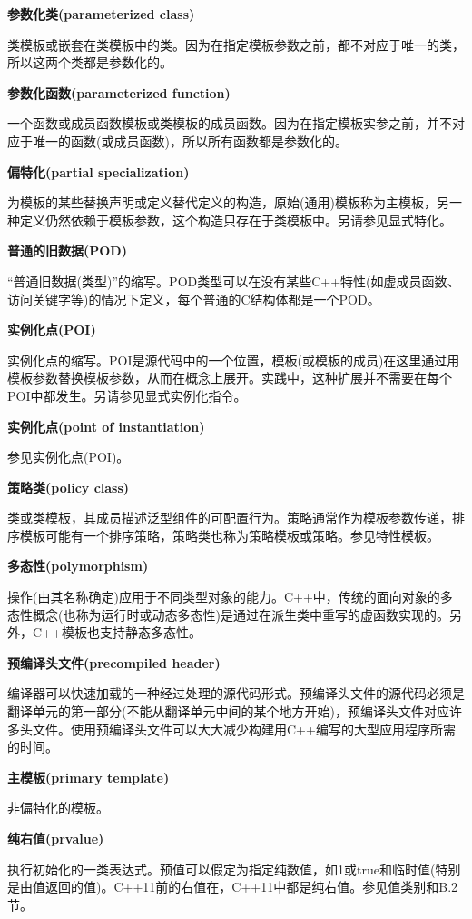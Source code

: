 \noindent
\textbf{参数化类(parameterized class)}

类模板或嵌套在类模板中的类。因为在指定模板参数之前，都不对应于唯一的类，所以这两个类都是参数化的。

\noindent
\textbf{参数化函数(parameterized function)}

一个函数或成员函数模板或类模板的成员函数。因为在指定模板实参之前，并不对应于唯一的函数(或成员函数)，所以所有函数都是参数化的。

\noindent
\textbf{偏特化(partial specialization)}

为模板的某些替换声明或定义替代定义的构造，原始(通用)模板称为主模板，另一种定义仍然依赖于模板参数，这个构造只存在于类模板中。另请参见显式特化。

\noindent
\textbf{普通的旧数据(POD)}

“普通旧数据(类型)”的缩写。POD类型可以在没有某些C++特性(如虚成员函数、访问关键字等)的情况下定义，每个普通的C结构体都是一个POD。

\noindent
\textbf{实例化点(POI)}

实例化点的缩写。POI是源代码中的一个位置，模板(或模板的成员)在这里通过用模板参数替换模板参数，从而在概念上展开。实践中，这种扩展并不需要在每个POI中都发生。另请参见显式实例化指令。

\noindent
\textbf{实例化点(point of instantiation)}

参见实例化点(POI)。

\noindent
\textbf{策略类(policy class)}

类或类模板，其成员描述泛型组件的可配置行为。策略通常作为模板参数传递，排序模板可能有一个排序策略，策略类也称为策略模板或策略。参见特性模板。

\noindent
\textbf{多态性(polymorphism)}

操作(由其名称确定)应用于不同类型对象的能力。C++中，传统的面向对象的多态性概念(也称为运行时或动态多态性)是通过在派生类中重写的虚函数实现的。另外，C++模板也支持静态多态性。

\noindent
\textbf{预编译头文件(precompiled header)}

编译器可以快速加载的一种经过处理的源代码形式。预编译头文件的源代码必须是翻译单元的第一部分(不能从翻译单元中间的某个地方开始)，预编译头文件对应许多头文件。使用预编译头文件可以大大减少构建用C++编写的大型应用程序所需的时间。

\noindent
\textbf{主模板(primary template)}

非偏特化的模板。

\noindent
\textbf{纯右值(prvalue)}

执行初始化的一类表达式。预值可以假定为指定纯数值，如1或true和临时值(特别是由值返回的值)。C++11前的右值在，C++11中都是纯右值。参见值类别和B.2节。

